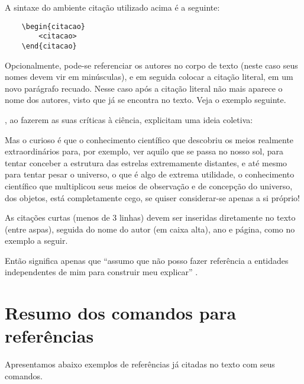 A sintaxe do ambiente citação utilizado acima é a seguinte:
\begin{verbatim}
    \begin{citacao}
        <citacao>
    \end{citacao}
\end{verbatim}

Opcionalmente, pode-se referenciar os autores no corpo de texto (neste caso seus nomes devem vir em minúsculas), e em seguida colocar a citação literal, em um novo parágrafo recuado. Nesse caso após a citação literal não mais aparece o nome dos autores, visto que já se encontra no texto.
Veja o exemplo seguinte.

, ao fazerem as suas críticas à ciência, explicitam uma ideia coletiva:

\begin{citacao}
Mas o curioso é que o conhecimento científico que descobriu os meios realmente extraordinários para, por exemplo, ver aquilo que se passa no nosso sol, para tentar conceber a estrutura das estrelas extremamente distantes, e até mesmo para tentar pesar o universo, o que é algo de extrema utilidade, o conhecimento científico que multiplicou seus meios de observação e de concepção do universo, dos objetos, está completamente cego, se quiser considerar-se apenas a si próprio!
\end{citacao}

As citações curtas (menos de 3 linhas) devem ser inseridas diretamente no texto (entre aspas), seguida do nome do autor (em caixa alta), ano e página, como no exemplo a seguir.

Então significa apenas que ``assumo que não posso fazer referência a entidades independentes de mim para construir meu explicar'' \cite[p.~35]{maturana:2003}.

\section{Resumo dos comandos para  referências }\label{referenciasUtilizadas}

Apresentamos abaixo exemplos de referências já citadas no texto com seus comandos.

